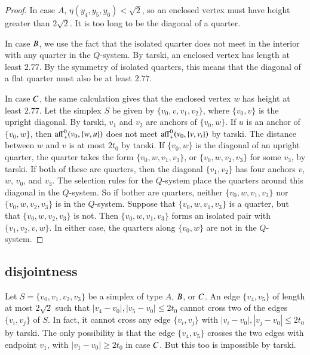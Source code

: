 
\begin{proof}
In case $A$, $\eta(y_4,y_5,y_6)<\sqrt{2}$, so an enclosed vertex
must have height greater than $2\sqrt{2}$.  It is too long to be
the diagonal of a quarter.

In case $B$, we use the fact that the isolated quarter does not
meet in the interior with any quarter in the $Q$-system. 
By tarski, an
enclosed vertex has length at least $2.77$.
By the symmetry of isolated quarters, this means that the diagonal
of a flat quarter must also be at least $2.77$.

In case $C$, the same calculation gives that the enclosed vertex
$w$ has height at least $2.77$.  Let the simplex $S$ be given by
$\{v_0,v,v_1,v_2\}$, where $\{v_0,v\}$ is the upright diagonal. By
tarski, $v_1$ and $v_2$ are anchors of
$\{v_0,w\}$. If $u$ is an anchor of $\{v_0,w\}$, then ${\operatorname{aff}}_+^0(v_0,\{w,u\})$
does not meet ${\operatorname{aff}}_+^0(v_0,\{v,v_i\})$ by
tarski. 
The distance between $w$ and $v$ is at most
$2t_0$ by tarski. If $\{v_0,w\}$ is the
diagonal of an upright quarter, the quarter takes the form
$\{v_0,w,v_1,v_3\}$, or $\{v_0,w,v_2,v_3\}$ for some $v_3$, by
tarski. If both of these are quarters, then
the diagonal $\{v_1,v_2\}$ has four anchors $v$, $w$, $v_0$, and
$v_3$. The selection rules for the $Q$-system place the quarters
around this diagonal in the $Q$-system. So if bother are quarters, neither $\{v_0,w,v_1,v_3\}$
nor $\{v_0,w,v_2,v_3\}$ is in the $Q$-system. Suppose that
$\{v_0,w,v_1,v_3\}$ is a quarter, but that $\{v_0,w,v_2,v_3\}$ is not.
Then $\{v_0,w,v_1,v_3\}$ forms an isolated pair with $\{v_1,v_2,v,w\}$.
In either case, the quarters along $\{v_0,w\}$ are not in the
$Q$-system.
\end{proof}

%

\subsection{disjointness}%

Let $S=\{v_0,v_1,v_2,v_3\}$ be a simplex of type $A$, $B$, or
$C$. An edge $\{v_4,v_5\}$ of length at most $2\sqrt{2}$ such
that $|v_4-v_0|,|v_5-v_0|\le 2t_0$ cannot cross two of the edges
$\{v_i,v_j\}$ of $S$.  In fact, it cannot cross any edge $\{v_i,v_j\}$
with $|v_i-v_0|,|v_j-v_0|\le 2t_0$ by tarski.  The
only possibility is that the edge $\{v_4,v_5\}$ crosses the two
edges with endpoint $v_1$, with $|v_1-v_0|\ge2t_0$ in case $C$.  But
this too is impossible by tarski.

